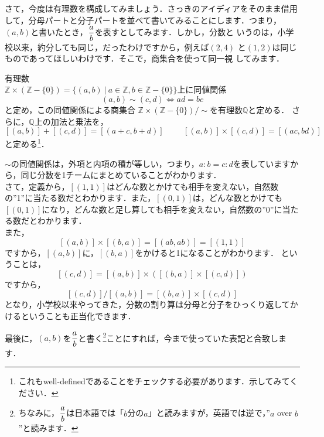 さて，今度は有理数を構成してみましょう．さっきのアイディアをそのまま借用
して，分母パートと分子パートを並べて書いてみることにします．つまり，
$(a,b)$と書いたとき，$\displaystyle\frac{a}{b}$を表すとしてみます．しかし，分数と
いうのは，小学校以来，約分しても同じ，だったわけですから，例えば$(2,4)$
と$(1,2)$は同じものであってほしいわけです．そこで，商集合を使って同一視
してみます．

\begin{defi}有理数\\
$\mathbb{Z}\times(\mathbb{Z}-\{0\})=\{(a,b)\ |\
 a\in\mathbb{Z},b\in\mathbb{Z}-\{0\}\}$上に同値関係
 \[
  (a,b)\sim(c,d)\Leftrightarrow ad=bc
 \]
 と定め，この同値関係による商集合
 $\mathbb{Z}\times(\mathbb{Z}-\{0\})/\sim$を有理数$\mathbb{Q}$と定める．
 さらに，$\mathbb{Q}$上の加法と乗法を，
 \[
  [(a,b)]+[(c,d)]=[(a+c,b+d)]\hspace{1cm}[(a,b)]\times[(c,d)]=[(ac,bd)]
 \]
 と定める\footnote{これもwell-definedであることをチェックする必要があります．示してみてください．}．
\end{defi}

$\sim$の同値関係は，外項と内項の積が等しい，つまり，$a:b=c:d$を表していますから，同じ分数を1チームにまとめていることがわかります．\\
さて，定義から，$[(1,1)]$はどんな数とかけても相手を変えない，自然数の''1''に当たる数だとわかります．また，$[(0,1)]$は，どんな数とかけても$[(0,1)]$になり，どんな数と足し算しても相手を変えない，自然数の''0''に当たる数だとわかります．\\
また，
\[
 [(a,b)]\times[(b,a)]=[(ab,ab)]=[(1,1)]
\]
ですから，$[(a,b)]$に，$[(b,a)]$をかけると1になることがわかります．
ということは，
\[
 [(c,d)]=[(a,b)]\times([(b,a)]\times[(c,d)])
\]
ですから，
\[
 [(c,d)]/[(a,b)]=[(b,a)]\times[(c,d)]
\]
となり，小学校以来やってきた，分数の割り算は分母と分子をひっくり返してかけるということも正当化できます．

最後に，$(a,b)$を$\displaystyle\frac{a}{b}$と書く\footnote{ちなみに，$\displaystyle\frac{a}{b}$は日本語では「$b$分の$a$」と読みますが，英語では逆で，''$a$ over $b$''と読みます．}ことにすれば，今まで使っていた表記と合致します．


